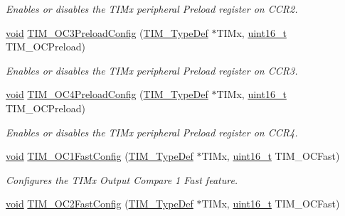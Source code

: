 \begin{DoxyCompactItemize}
\begin{DoxyCompactList}\small\item\em Enables or disables the T\+I\+Mx peripheral Preload register on C\+C\+R2. \end{DoxyCompactList}\item 
\hyperlink{usb__devapi_8h_afabf60e7f57651d6d595a02c75f07cd0}{void} \hyperlink{group___t_i_m___exported___functions_ga8b2391685a519e60e596b7d596f86f09}{T\+I\+M\+\_\+\+O\+C3\+Preload\+Config} (\hyperlink{struct_t_i_m___type_def}{T\+I\+M\+\_\+\+Type\+Def} $\ast$T\+I\+Mx, \hyperlink{_p_e___types_8h_a1f1825b69244eb3ad2c7165ddc99c956}{uint16\+\_\+t} T\+I\+M\+\_\+\+O\+C\+Preload)
\begin{DoxyCompactList}\small\item\em Enables or disables the T\+I\+Mx peripheral Preload register on C\+C\+R3. \end{DoxyCompactList}\item 
\hyperlink{usb__devapi_8h_afabf60e7f57651d6d595a02c75f07cd0}{void} \hyperlink{group___t_i_m___exported___functions_ga8bf4dfb35ff0c7b494dd96579f50b1ec}{T\+I\+M\+\_\+\+O\+C4\+Preload\+Config} (\hyperlink{struct_t_i_m___type_def}{T\+I\+M\+\_\+\+Type\+Def} $\ast$T\+I\+Mx, \hyperlink{_p_e___types_8h_a1f1825b69244eb3ad2c7165ddc99c956}{uint16\+\_\+t} T\+I\+M\+\_\+\+O\+C\+Preload)
\begin{DoxyCompactList}\small\item\em Enables or disables the T\+I\+Mx peripheral Preload register on C\+C\+R4. \end{DoxyCompactList}\item 
\hyperlink{usb__devapi_8h_afabf60e7f57651d6d595a02c75f07cd0}{void} \hyperlink{group___t_i_m___exported___functions_gaec82031ca62f31f5483195c09752a83a}{T\+I\+M\+\_\+\+O\+C1\+Fast\+Config} (\hyperlink{struct_t_i_m___type_def}{T\+I\+M\+\_\+\+Type\+Def} $\ast$T\+I\+Mx, \hyperlink{_p_e___types_8h_a1f1825b69244eb3ad2c7165ddc99c956}{uint16\+\_\+t} T\+I\+M\+\_\+\+O\+C\+Fast)
\begin{DoxyCompactList}\small\item\em Configures the T\+I\+Mx Output Compare 1 Fast feature. \end{DoxyCompactList}\item 
\hyperlink{usb__devapi_8h_afabf60e7f57651d6d595a02c75f07cd0}{void} \hyperlink{group___t_i_m___exported___functions_ga413359c87f46c69f1ffe2dc8fb3a65e7}{T\+I\+M\+\_\+\+O\+C2\+Fast\+Config} (\hyperlink{struct_t_i_m___type_def}{T\+I\+M\+\_\+\+Type\+Def} $\ast$T\+I\+Mx, \hyperlink{_p_e___types_8h_a1f1825b69244eb3ad2c7165ddc99c956}{uint16\+\_\+t} T\+I\+M\+\_\+\+O\+C\+Fast)

\end{DoxyCompactItemize}
